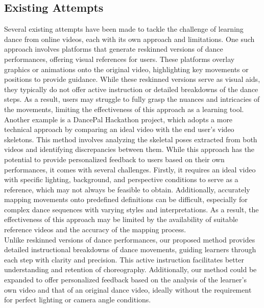 \subsection{Existing Attempts}
\indent Several existing attempts have been made to tackle the challenge of learning dance from online 
videos, each with its own approach and limitations. One such approach involves platforms that 
generate reskinned versions of dance performances, offering visual references for users. These 
platforms overlay graphics or animations onto the original video, highlighting key movements or 
positions to provide guidance. While these reskinned versions serve as visual aids, they 
typically do not offer active instruction or detailed breakdowns of the dance steps. As a result, 
users may struggle to fully grasp the nuances and intricacies of the movements, limiting the 
effectiveness of this approach as a learning tool.
\\
\indent Another example is a DancePal Hackathon project, which adopts a more technical approach by 
comparing an ideal video with the end user's video skeletons\cite{Authors14c}. This method involves analyzing the 
skeletal poses extracted from both videos and identifying discrepancies between them. While this 
approach has the potential to provide personalized feedback to users based on their own performances, 
it comes with several challenges. Firstly, it requires an ideal video with specific lighting, 
background, and perspective conditions to serve as a reference, which may not always be feasible 
to obtain. Additionally, accurately mapping movements onto predefined definitions can be difficult, 
especially for complex dance sequences with varying styles and interpretations. As a result, the 
effectiveness of this approach may be limited by the availability of suitable reference videos and 
the accuracy of the mapping process.
\\
\indent Unlike reskinned versions of dance performances, our proposed method provides detailed instructional 
breakdowns of dance movements, guiding learners through each step with clarity and precision. This 
active instruction facilitates better understanding and retention of choreography. Additionally, our 
method could be expanded to offer personalized feedback based on the analysis of the learner's own 
video and that of an original dance video, ideally without the requirement for perfect lighting or 
camera angle conditions.

